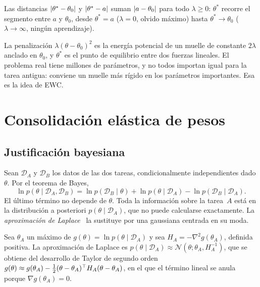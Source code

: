 \begin{corolario}\label{cor:frontera}
Las distancias $\lvert\theta^{\ast}-\theta_0\rvert$ y $\lvert\theta^{\ast}-a\rvert$ suman $\lvert a-\theta_0\rvert$ para todo $\lambda\ge 0$: $\theta^{\ast}$ recorre el segmento entre $a$ y $\theta_0$, desde $\theta^{\ast}=a$ ($\lambda=0$, olvido máximo) hasta $\theta^{\ast}\to\theta_0$ ($\lambda\to\infty$, ningún aprendizaje).
\end{corolario}

\addtocounter{definicion}{1}%

La penalización $\lambda(\theta-\theta_0)^{2}$ es la energía potencial de un muelle de constante $2\lambda$ anclado en $\theta_0$, y $\theta^{\ast}$ es el punto de equilibrio entre dos fuerzas lineales. El problema real tiene millones de parámetros, y no todos importan igual para la tarea antigua: conviene un muelle más rígido en los parámetros importantes. Esa es la idea de EWC.

\section{Consolidación elástica de pesos}

\subsection{Justificación bayesiana}

Sean $\mathcal{D}_A$ y $\mathcal{D}_B$ los datos de las dos tareas, condicionalmente independientes dado $\theta$. Por el teorema de Bayes,
\begin{equation}\label{eq:bayes-secuencial}
\ln p(\theta\mid\mathcal{D}_A,\mathcal{D}_B)=\ln p(\mathcal{D}_B\mid\theta)+\ln p(\theta\mid\mathcal{D}_A)-\ln p(\mathcal{D}_B\mid\mathcal{D}_A).
\end{equation}
El último término no depende de $\theta$. Toda la información sobre la tarea~$A$ está en la distribución a posteriori $p(\theta\mid\mathcal{D}_A)$, que no puede calcularse exactamente. La \emph{aproximación de Laplace}~\cite[§4.4]{bishop} la sustituye por una gaussiana centrada en su moda.

\begin{definicion}\label{def:laplace}
Sea $\theta_A$ un máximo de $g(\theta)=\ln p(\theta\mid\mathcal{D}_A)$ y sea $H_A=-\nabla^{2}g(\theta_A)$, definida positiva. La aproximación de Laplace es $p(\theta\mid\mathcal{D}_A)\approx\mathcal{N}(\theta;\theta_A,H_A^{-1})$, que se obtiene del desarrollo de Taylor de segundo orden $g(\theta)\approx g(\theta_A)-\frac12(\theta-\theta_A)^{\top} H_A(\theta-\theta_A)$, en el que el término lineal se anula porque $\nabla g(\theta_A)=0$.
\end{definicion}

